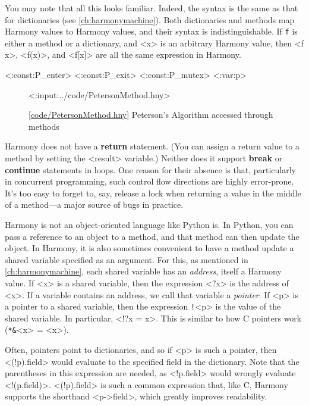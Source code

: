 \documentclass{report}
\newcommand{\harmonylink}[1]{%
[\href{https://harmony.cs.cornell.edu/#1}{\underline{#1}}]%
}
\newenvironment{code}{
\tcolorbox
}{
\endtcolorbox
}
\begin{document}
You may note that all this looks familiar.  Indeed, the syntax
is the same as that for dictionaries (see \autoref{ch:harmonymachine}).
Both dictionaries and methods map Harmony values to Harmony values,
and their syntax is indistinguishable.
If \texttt{f} is either a method or a
dictionary, and <{x}> is an arbitrary Harmony value, then
<{f x}>, <{f(x)}>, and <{f[x]}> are all
the same expression in Harmony.

<{:const:P_enter}>
<{:const:P_exit}>
<{:const:P_mutex}>
<{:var:p}>

\begin{figure}
\begin{code}
<{:input:../code/PetersonMethod.hny}>
\end{code}
\caption{\harmonylink{code/PetersonMethod.hny} Peterson's Algorithm accessed through methods}
\label{fig:petersonmethods}
\end{figure}

Harmony does not have a \textbf{return} statement.  (You can assign a return value
to a method by setting the <{result}> variable.)  Neither does it support
\textbf{break} or \textbf{continue} statements in loops.  One reason for their absence is
that, particularly in concurrent programming, such control flow directions are highly
error-prone.  It's too easy to forget to, say, release a lock when returning a value in the
middle of a method---a major source of bugs in practice.

Harmony is not an object-oriented language like Python is.  In Python,
you can pass a reference to an object to a method, and that method
can then update the object.  In Harmony, it is also sometimes convenient
to have a method update a shared variable specified as an argument.
For this, as mentioned in \autoref{ch:harmonymachine},
each shared variable has an \emph{address}, itself a Harmony value.
%
If <{x}> is a shared variable, then the expression <{?x}> is the address of <{x}>.
If a variable contains an address, we call that variable a \emph{pointer}.
%
If <{p}> is a pointer to a shared variable, then the
expression \texttt{!}<{p}> is the value of the shared variable.
In particular, <{!?x = x}>.
This is similar to how C pointers work (\texttt{*\string&}<{x}> = <{x}>).

Often, pointers point to dictionaries, and so if <{p}> is such a pointer,
then <{(!p).field}> would evaluate to the specified field in the dictionary.
Note that the parentheses in this expression
are needed, as <{!p.field}> would wrongly evaluate
<{!(p.field)}>.
<{(!p).field}> is such a common expression that, like C, Harmony supports the
shorthand <{p->field}>, which greatly improves readability.
\end{document}

